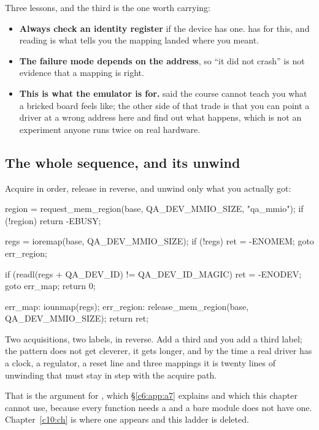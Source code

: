 Three lessons, and the third is the one worth carrying:
\begin{itemize}
  \item \textbf{Always check an identity register} if the device has one.  has
     for this, and reading  is what tells you the mapping landed
    where you meant.
  \item \textbf{The failure mode depends on the address}, so ``it did not crash'' is not evidence
    that a mapping is right.
  \item \textbf{This is what the emulator is for.}  said the course cannot teach
    you what a bricked board feels like; the other side of that trade is that you can point a driver
    at a wrong address here and find out what happens, which is not an experiment anyone runs twice
    on real hardware.
\end{itemize}

\subsection{The whole sequence, and its unwind}
\label{c6:app:b7}

Acquire in order, release in reverse, and unwind only what you actually got:

\begin{ccode}
region = request_mem_region(base, QA_DEV_MMIO_SIZE, "qa_mmio");
if (!region)
        return -EBUSY;

regs = ioremap(base, QA_DEV_MMIO_SIZE);
if (!regs) {
        ret = -ENOMEM;
        goto err_region;
}

if (readl(regs + QA_DEV_ID) != QA_DEV_ID_MAGIC) {
        ret = -ENODEV;
        goto err_map;
}
return 0;

err_map:
        iounmap(regs);
err_region:
        release_mem_region(base, QA_DEV_MMIO_SIZE);
        return ret;
\end{ccode}

\noindent Two acquisitions, two labels, in reverse. Add a third and you add a third label; the
pattern does not get cleverer, it gets longer, and by the time a real driver has a clock, a
regulator, a reset line and three mappings it is twenty lines of unwinding that must stay in step
with the acquire path.

That is the argument for , which \S\ref{c6:app:a7} explains and which this chapter
cannot use, because every  function needs a  and a bare module
does not have one. Chapter~\ref{c10:ch} is where one appears and this ladder is deleted.
